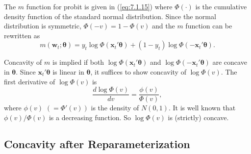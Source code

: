 \begin{example}
\label{ex:7.6}
The $m$ function for probit is given in (\ref{eq:7.1.15}) where $\Phi(\cdot)$ is the cumulative density function of the standard normal distribution. Since the normal distribution is symmetric, $\Phi(-v) = 1 - \Phi(v)$ and the $m$ function can be rewritten as
\begin{equation}
\label{eq:7.2.4}
m(\mathbf{w}_t; \bm{\theta}) = y_t \log \Phi(\mathbf{x}_t' \bm{\theta}) + (1 - y_t) \log \Phi(-\mathbf{x}_t' \bm{\theta}).
\end{equation}

Concavity of $m$ is implied if both $\log \Phi(\mathbf{x}_t' \bm{\theta})$ and $\log \Phi(-\mathbf{x}_t' \bm{\theta})$ are concave in $\bm{\theta}$. Since $\mathbf{x}_t' \bm{\theta}$ is linear in $\bm{\theta}$, it suffices to show concavity of $\log \Phi(v)$. The first derivative of $\log \Phi(v)$ is
\begin{equation}
\label{eq:7.2.5}
\frac{d \log \Phi(v)}{dv} = \frac{\phi(v)}{\Phi(v)},
\end{equation}
where $\phi(v)$ $(= \Phi'(v))$ is the density of $N(0,1)$. It is well known that $\phi(v)/\Phi(v)$ is a decreasing function. So $\log \Phi(v)$ is (strictly) concave.
\end{example}

\subsection*{Concavity after Reparameterization}

